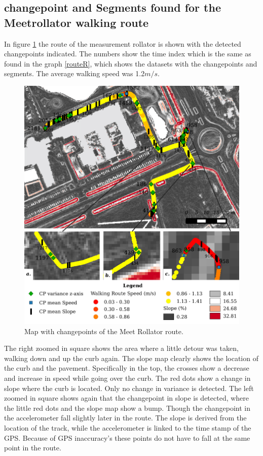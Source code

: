 \clearpage

\subsection{changepoint and Segments found for the Meetrollator walking route}
In figure \ref{routeM} the route of the measurement rollator is shown with the detected changepoints indicated. The numbers show the time index which is the same as found in the graph \ref{routeR}, which shows the datasets with the changepoints and segments. The average walking speed was 1.2$m/s$. 

\begin{figure}[ht]
\includegraphics[width=\textwidth]{img/R_meetrollatorroute.pdf}
\centering
\caption{Map with changepoints of the Meet Rollator route.\label{routeM}}
\end{figure} 

\clearpage

The right zoomed in square shows the area where a little detour was taken, walking down and up the curb again. The slope map clearly shows the location of the curb and the pavement. Specifically in the top, the crosses show a decrease and increase in speed while going over the curb. The red dots show a change in slope where the curb is located. Only no change in variance is detected. The left zoomed in square shows again that the changepoint in slope is detected, where the little red dots and the slope map show a bump. Though the changepoint in the accelerometer fall slightly later in the route. 
The slope is derived from the location of the track, while the accelerometer is linked to the time stamp of the GPS. Because of GPS inaccuracy's these points do not have to fall at the same point in the route.

